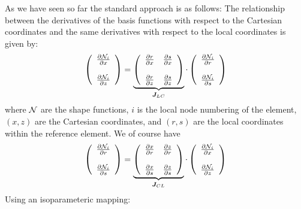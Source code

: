 As we have seen so far the standard approach is as follows:
The relationship between the derivatives of the basis functions with respect to the Cartesian coordinates and the same 
derivatives with respect to the local coordinates is given by:
\[
\left(
\begin{array}{c}
\frac{\partial {\mathcal{N}}_i}{\partial x} \\ \\
\frac{\partial {\mathcal{N}}_i}{\partial z} 
\end{array}
\right)
= 
\underbrace{\left(
\begin{array}{cc}
\frac{\partial r}{\partial x}  & 
\frac{\partial s}{\partial x}   \\ \\
\frac{\partial r}{\partial z}  & 
\frac{\partial s}{\partial z}  
\end{array}
\right)}_{{\bm J}_{LC}}
\cdot
\left(
\begin{array}{c}
\frac{\partial {\mathcal{N}}_i}{\partial r} \\ \\
\frac{\partial {\mathcal{N}}_i}{\partial s} 
\end{array}
\right)
\]
where ${\mathcal{N}}$ are the shape functions, $i$ is the local node numbering of the element, 
$(x,z)$ are the Cartesian coordinates, and $(r,s)$ are the local coordinates within the reference element.
We of course have
\[
\left(
\begin{array}{c}
\frac{\partial {\mathcal{N}}_i}{\partial r} \\ \\
\frac{\partial {\mathcal{N}}_i}{\partial s} 
\end{array}
\right)
= 
\underbrace{\left(
\begin{array}{cc}
\frac{\partial x}{\partial r}  & 
\frac{\partial z}{\partial r}   \\ \\
\frac{\partial x}{\partial s}  & 
\frac{\partial z}{\partial s}  
\end{array}
\right)}_{{\bm J}_{CL}}
\cdot
\left(
\begin{array}{c}
\frac{\partial {\mathcal{N}}_i}{\partial x} \\ \\
\frac{\partial {\mathcal{N}}_i}{\partial z} 
\end{array}
\right)
\]
Using an isoparameteric mapping:
